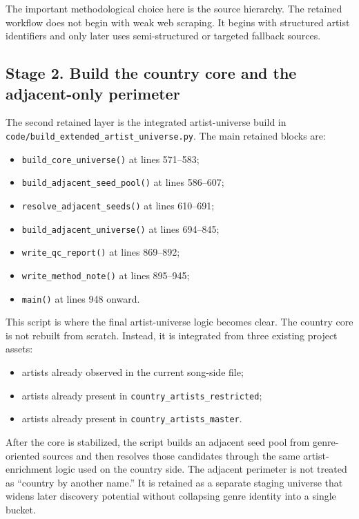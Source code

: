 \documentclass[11pt]{article}
\begin{document}
The important methodological choice here is the source hierarchy. The retained
workflow does not begin with weak web scraping. It begins with structured
artist identifiers and only later uses semi-structured or targeted fallback
sources.

\subsection{Stage 2. Build the country core and the adjacent-only perimeter}
The second retained layer is the integrated artist-universe build in
\texttt{code/build\_extended\_artist\_universe.py}. The main retained blocks are:
\begin{itemize}[leftmargin=2em]
\item \texttt{build\_core\_universe()} at lines 571--583;
\item \texttt{build\_adjacent\_seed\_pool()} at lines 586--607;
\item \texttt{resolve\_adjacent\_seeds()} at lines 610--691;
\item \texttt{build\_adjacent\_universe()} at lines 694--845;
\item \texttt{write\_qc\_report()} at lines 869--892;
\item \texttt{write\_method\_note()} at lines 895--945;
\item \texttt{main()} at lines 948 onward.
\end{itemize}

This script is where the final artist-universe logic becomes clear. The country
core is not rebuilt from scratch. Instead, it is integrated from three existing
project assets:
\begin{itemize}[leftmargin=2em]
\item artists already observed in the current song-side file;
\item artists already present in \texttt{country\_artists\_restricted};
\item artists already present in \texttt{country\_artists\_master}.
\end{itemize}

After the core is stabilized, the script builds an adjacent seed pool from
genre-oriented sources and then resolves those candidates through the same
artist-enrichment logic used on the country side. The adjacent perimeter is not
treated as ``country by another name.'' It is retained as a separate staging
universe that widens later discovery potential without collapsing genre
identity into a single bucket.
\end{document}
